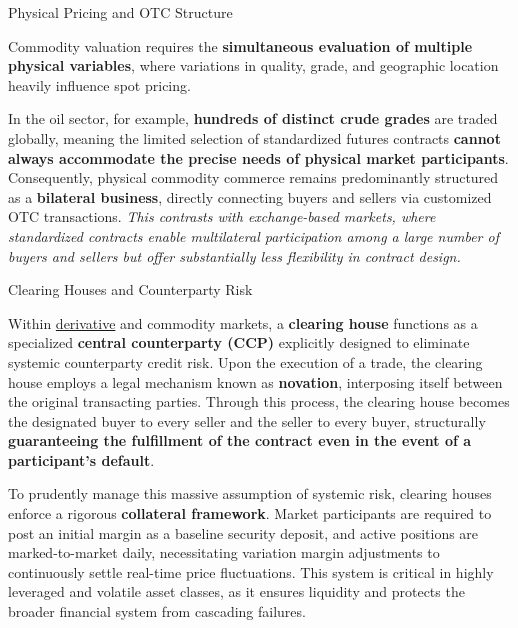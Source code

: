 \documentclass[10pt]{article}
\begin{document}
    \begin{core}[label=core:phy_pri]{Physical Pricing and OTC Structure}

      Commodity valuation requires the \textbf{simultaneous evaluation of multiple physical variables}, where variations in quality, grade, and geographic location heavily influence spot pricing.


      In the oil sector, for example, \textbf{hundreds of distinct crude grades} are traded globally, meaning the limited selection of standardized futures contracts \textbf{cannot always accommodate the precise needs of physical market participants}. Consequently, physical commodity commerce remains predominantly structured as a \textbf{bilateral business}, directly connecting buyers and sellers via customized OTC transactions. \textit{This contrasts with exchange-based markets, where standardized contracts enable multilateral participation among a large number of buyers and sellers but offer substantially less flexibility in contract design.}

    \end{core}

    \begin{core}{Clearing Houses and Counterparty Risk}

      Within \href{https://ibahng.github.io/finance_markets/derivatives/derivatives.pdf}{derivative} and commodity markets, a \textbf{clearing house} functions as a specialized \textbf{central counterparty (CCP)} explicitly designed to eliminate systemic counterparty credit risk. Upon the execution of a trade, the clearing house employs a legal mechanism known as \textbf{novation}, interposing itself between the original transacting parties. Through this process, the clearing house becomes the designated buyer to every seller and the seller to every buyer, structurally \textbf{guaranteeing the fulfillment of the contract even in the event of a participant's default}.


      To prudently manage this massive assumption of systemic risk, clearing houses enforce a rigorous \textbf{collateral framework}. Market participants are required to post an initial margin as a baseline security deposit, and active positions are marked-to-market daily, necessitating variation margin adjustments to continuously settle real-time price fluctuations. This system is critical in highly leveraged and volatile asset classes, as it ensures liquidity and protects the broader financial system from cascading failures.

    \end{core}
\end{document}
